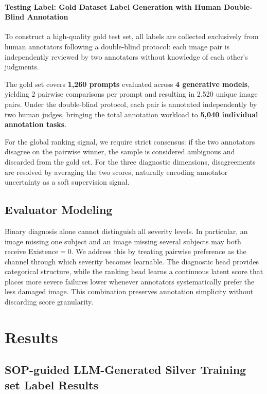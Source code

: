 \documentclass{article}
\begin{document}
\paragraph{Testing Label: Gold Dataset Label Generation with Human Double-Blind Annotation}
To construct a high-quality gold test set, all labels are collected exclusively from human annotators following a double-blind protocol: each image pair is independently reviewed by two annotators without knowledge of each other's judgments.

The gold set covers \textbf{1{,}260 prompts} evaluated across \textbf{4 generative models}, yielding 2 pairwise comparisons per prompt and resulting in 2{,}520 unique image pairs. Under the double-blind protocol, each pair is annotated independently by two human judges, bringing the total annotation workload to \textbf{5{,}040 individual annotation tasks}.

For the global ranking signal, we require strict consensus: if the two annotators disagree on the pairwise winner, the sample is considered ambiguous and discarded from the gold set. For the three diagnostic dimensions, disagreements are resolved by averaging the two scores, naturally encoding annotator uncertainty as a soft supervision signal.


\subsection{Evaluator Modeling}
Binary diagnosis alone cannot distinguish all severity levels. In particular, an image missing one subject and an image missing several subjects may both receive Existence$=0$. We address this by treating pairwise preference as the channel through which severity becomes learnable. The diagnostic head provides categorical structure, while the ranking head learns a continuous latent score that places more severe failures lower whenever annotators systematically prefer the less damaged image. This combination preserves annotation simplicity without discarding score granularity.








\section{Results}
\subsection{SOP-guided LLM-Generated Silver Training set Label Results}
\label{sec:results_sop_alignment}
\end{document}
